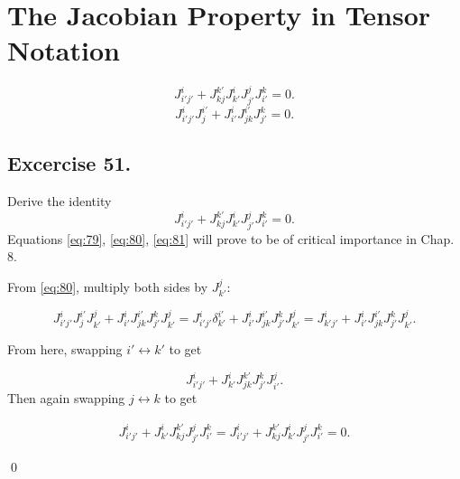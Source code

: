 \documentclass[../main.tex]{subfiles}
\begin{document}
\section{The Jacobian Property in Tensor Notation}

\begin{equation}
    J^i_{i' j'}+J^{k'}_{kj}J^i_{k'}J^j_{j'}J^k_{i'}=0.
    \label{eq:79}
\end{equation}
\begin{equation}
    J^i_{i' j'}J^{i'}_j+J^i_{i'}J^{i'}_{jk}J^k_{j'}=0.
    \label{eq:80}
\end{equation}


\subsection{Excercise 51.}


Derive the identity
\begin{equation}
    J^i_{i' j'}+J^{k'}_{kj}J^i_{k'}J^j_{j'}J^k_{i'}=0.
    \label{eq:81}
\end{equation}
Equations \ref{eq:79}, \ref{eq:80}, \ref{eq:81} will prove to be of critical importance in Chap. 8.



\sol

From \ref{eq:80}, multiply both sides by $J^j_{k'}$:


\begin{equation}
    J^i_{i' j'}J^{i'}_jJ^j_{k'}+J^i_{i'}J^{i'}_{jk}J^k_{j'}J^j_{k'}
    = J^i_{i' j'}\delta^{i'}_{k'}+J^i_{i'}J^{i'}_{jk}J^k_{j'}J^j_{k'}
    = J^i_{k' j'}+J^i_{i'}J^{i'}_{jk}J^k_{j'}J^j_{k'}.
\end{equation}

From here, swapping $i' \longleftrightarrow k'$ to get

\begin{equation}
    J^i_{i' j'}+J^i_{k'}J^{k'}_{jk}J^k_{j'}J^j_{i'}.
\end{equation}
Then again swapping $j \longleftrightarrow k$ to get

\begin{align}
    J^i_{i' j'}+J^i_{k'}J^{k'}_{kj}J^j_{j'}J^k_{i'} 
    = J^i_{i' j'}+J^{k'}_{kj}J^i_{k'}J^j_{j'}J^k_{i'}=0.
\end{align}

\qed
\end{document}

